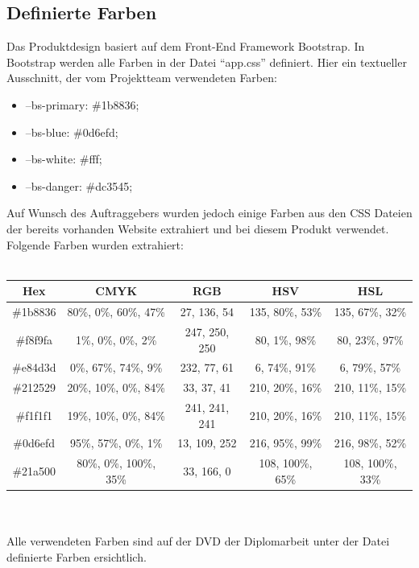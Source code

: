 \subsection{Definierte Farben}
Das Produktdesign basiert auf dem Front-End Framework Bootstrap. In Bootstrap werden alle Farben in der Datei “app.css” definiert. Hier ein textueller Ausschnitt, der vom Projektteam verwendeten Farben:
\\
\begin{itemize}
	\item --bs-primary: \#1b8836;
	\item --bs-blue: \#0d6efd;
	\item --bs-white: \#fff;
	\item --bs-danger: \#dc3545;
\end{itemize}
\newpage
Auf Wunsch des Auftraggebers wurden jedoch einige Farben aus den CSS Dateien der bereits vorhanden Website extrahiert und bei diesem Produkt verwendet. Folgende Farben wurden extrahiert:
\\
\\
\begin{tabular}{|c|c|c|c|c|}
	\hline
	Hex & CMYK & RGB & HSV & HSL \\
	\hline
	\#1b8836 & 80\%, 0\%, 60\%, 47\% & 27, 136, 54 & 135, 80\%, 53\% & 135, 67\%, 32\%  \\
	\hline 
	\#f8f9fa & 1\%, 0\%, 0\%, 2\% & 247, 250, 250 & 80, 1\%, 98\% & 80, 23\%, 97\% \\
	\hline
	\#e84d3d & 0\%, 67\%, 74\%, 9\% & 232, 77, 61 & 6, 74\%, 91\% & 6, 79\%, 57\% \\
	\hline
	\#212529 & 20\%, 10\%, 0\%, 84\% & 33, 37, 41 & 210, 20\%, 16\% & 210, 11\%, 15\% \\
	\hline
	\#f1f1f1 & 19\%, 10\%, 0\%, 84\% & 241, 241, 241 & 210, 20\%, 16\% & 210, 11\%, 15\% \\
	\hline
	\#0d6efd & 95\%, 57\%, 0\%, 1\% & 13, 109, 252 & 216, 95\%, 99\% & 216, 98\%, 52\% \\
	\hline
	\#21a500 & 80\%, 0\%, 100\%, 35\% & 33, 166, 0 & 108, 100\%, 65\% & 108, 100\%, 33\% \\
	\hline
	

\end{tabular}
	\\
\\
Alle verwendeten Farben sind auf der DVD der Diplomarbeit unter der Datei definierte Farben ersichtlich.

